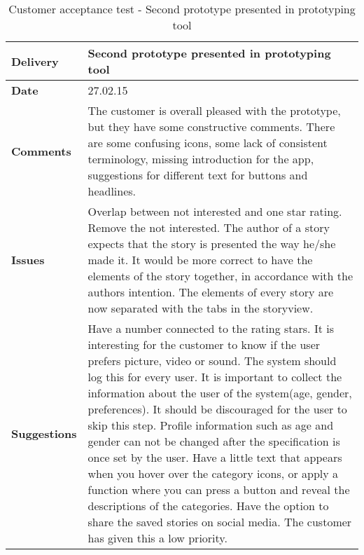 \renewcommand{\arraystretch}{2}%
\begin{center}
	\small
	\begin{longtable}{ | p{4cm} | p{13cm} | }
		
		\caption[Customer acceptance test - Second prototype]{Customer acceptance test - Second prototype presented in prototyping tool} \label{Tab:cattest2}\\
		\hline
		\textbf{Delivery} & Second prototype presented in prototyping tool\\ \hline
		\textbf{Date} & 27.02.15 \\ \hline 
		\textbf{Comments}&
		The customer is overall pleased with the prototype, but they have some constructive comments. 
		There are some confusing icons, some lack of consistent terminology, missing introduction for the app, suggestions for different text for buttons and headlines.
		\\ \hline
		\textbf{Issues} 	 &	
		Overlap between not interested and one star rating. Remove the not interested. The author of a story expects that the story is presented the way he/she made it. It would be more correct to have the elements of the story together, in accordance with the authors intention. The elements of every story are now separated with the tabs in the storyview. 	 	
		\\ \hline
		\textbf{Suggestions} &
		 Have a number connected to the rating stars. It is interesting for the customer to know if the user prefers picture, video or sound. The system should log this for every user. It is important to collect the information about the user of the system(age, gender, preferences). It should be discouraged for the user to skip this step. Profile information such as age and gender can not be changed after the specification is once set by the user. Have a little text that appears when you hover over the category icons, or apply a function where you can press a button and reveal the descriptions of the categories. Have the option to share the saved stories on social media. The customer has given this a low priority.
		\\ \hline
	\end{longtable}
\end{center}

